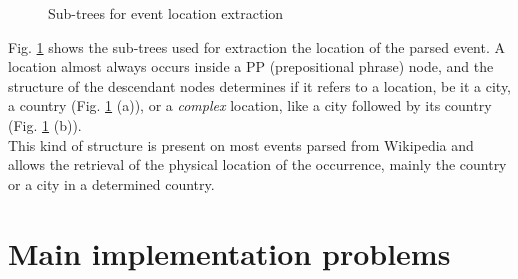\documentclass{llncs}
\begin{document}
\begin{figure}[h]
	\centering
	\hspace{20mm}
	\caption{Sub-trees for event location extraction}
	\label{fig:location-extraction}
\end{figure}

Fig. \ref{fig:location-extraction} shows the sub-trees used for extraction the location of the parsed event. A location almost always occurs inside a PP (prepositional phrase) node, and the structure of the descendant nodes determines if it refers to a location, be it a city, a country (Fig. \ref{fig:location-extraction} (a)), or a \textit{complex} location, like a city followed by its country (Fig. \ref{fig:location-extraction} (b)).\\

This kind of structure is present on most events parsed from Wikipedia and allows the retrieval of the physical location of the occurrence, mainly the country or a city in a determined country.

%
\section{Main implementation problems}
\end{document}
